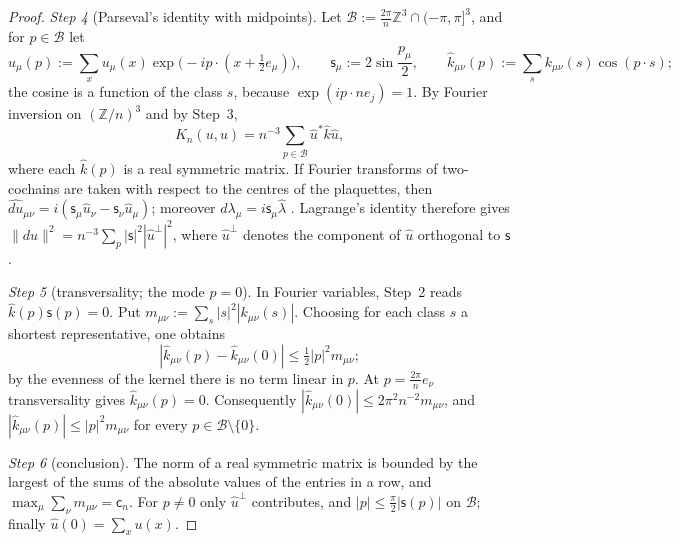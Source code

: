 \documentclass[11pt]{amsart}
\theoremstyle{definition}
\begin{document}
\begin{proof}
\emph{Step 4} (Parseval's identity with midpoints).
Let $\mathcal B:=\frac{2\pi}{n}\mathbb Z^3\cap(-\pi,\pi]^3$, and for $p\in\mathcal B$ let
\begin{equation*}
\hat u_\mu(p):=\sum_xu_\mu(x)\exp\bigl(-ip\cdot(x+\tfrac12e_\mu)\bigr),\qquad\mathsf s_\mu:=2\sin\frac{p_\mu}{2},\qquad\hat k_{\mu\nu}(p):=\sum_sk_{\mu\nu}(s)\cos(p\cdot s);
\end{equation*}
the cosine is a function of the class $s$, because $\exp(ip\cdot ne_j)=1$.
By Fourier inversion on $(\mathbb Z/n)^3$ and by Step~3,
\begin{equation*}
K_n(u,u)=n^{-3}\sum_{p\in\mathcal B}\hat u^*\hat k\hat u,
\end{equation*}
where each $\hat k(p)$ is a real symmetric matrix.
If Fourier transforms of two-cochains are taken with respect to the centres of the plaquettes, then $\widehat{du}_{\mu\nu}=\allowbreak i(\mathsf s_\mu\hat u_\nu-\mathsf s_\nu\hat u_\mu)$; moreover $\widehat{d\lambda}_\mu=i\mathsf s_\mu\hat\lambda$ \cite[Definition~2.1]{QEDII}.
Lagrange's identity therefore gives $\|du\|^2=n^{-3}\sum_p|\mathsf s|^2|\hat u^\perp|^2$, where $\hat u^\perp$ denotes the component of $\hat u$ orthogonal to $\mathsf s$.

\emph{Step 5} (transversality; the mode $p=0$).
In Fourier variables, Step~2 reads $\hat k(p)\mathsf s(p)=0$.
Put $m_{\mu\nu}:=\sum_s|s|^2|k_{\mu\nu}(s)|$.
Choosing for each class $s$ a shortest representative, one obtains
\begin{equation*}
|\hat k_{\mu\nu}(p)-\hat k_{\mu\nu}(0)|\le\tfrac12|p|^2m_{\mu\nu};
\end{equation*}
by the evenness of the kernel there is no term linear in $p$.
At $p=\frac{2\pi}{n}e_\nu$ transversality gives $\hat k_{\mu\nu}(p)=0$.
Consequently $|\hat k_{\mu\nu}(0)|\le2\pi^2n^{-2}m_{\mu\nu}$, and $|\hat k_{\mu\nu}(p)|\le|p|^2m_{\mu\nu}$ for every $p\in\mathcal B\setminus\{0\}$.

\emph{Step 6} (conclusion).
The norm of a real symmetric matrix is bounded by the largest of the sums of the absolute values of the entries in a row, and $\max_\mu\sum_\nu m_{\mu\nu}=\mathsf c_n$.
For $p\ne0$ only $\hat u^\perp$ contributes, and $|p|\le\frac\pi2|\mathsf s(p)|$ on $\mathcal B$; finally $\hat u(0)=\sum_xu(x)$.
\end{proof}
\end{document}
